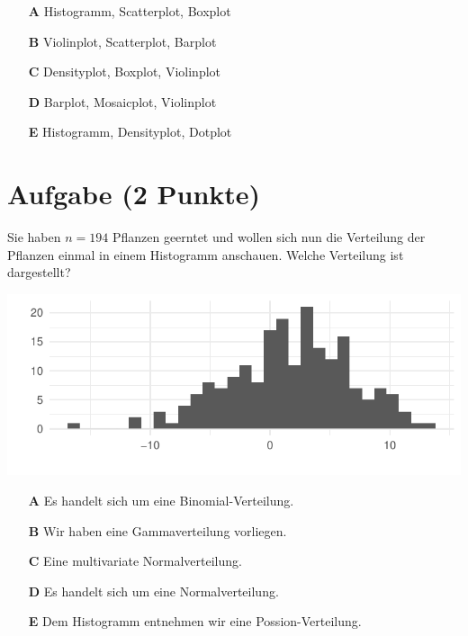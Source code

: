 \documentclass[a4paper, 9pt]{scrartcl}\usepackage[]{graphicx}\usepackage[]{xcolor}
\makeatletter
\def\maxwidth{ %
  \ifdim\Gin@nat@width>\linewidth
    \linewidth
  \else
    \Gin@nat@width
  \fi
}
\makeatother
\begin{document}
\begin{enumerate}
\item [\textbf{A} \msquare] Histogramm, Scatterplot, Boxplot
\item [\textbf{B} \msquare] Violinplot, Scatterplot, Barplot
\item [\textbf{C} \msquare] Densityplot, Boxplot, Violinplot
\item [\textbf{D} \msquare] Barplot, Mosaicplot, Violinplot
\item [\textbf{E} \msquare] Histogramm, Densityplot, Dotplot
\end{enumerate} 

\section{Aufgabe \hfill (2 Punkte)}



Sie haben $n = 194$ Pflanzen geerntet und wollen sich nun die Verteilung der Pflanzen einmal in einem Histogramm anschauen. Welche Verteilung ist dargestellt?



{\centering \includegraphics[width=\maxwidth]{img/mc-distribution-02-a-1} 

}







\begin{enumerate}
\item [\textbf{A} \msquare] Es handelt sich um eine Binomial-Verteilung.
\item [\textbf{B} \msquare] Wir haben eine Gammaverteilung vorliegen.
\item [\textbf{C} \msquare] Eine multivariate Normalverteilung.
\item [\textbf{D} \msquare] Es handelt sich um eine Normalverteilung.
\item [\textbf{E} \msquare] Dem Histogramm entnehmen wir eine Possion-Verteilung.
\end{enumerate} 
\end{document}
